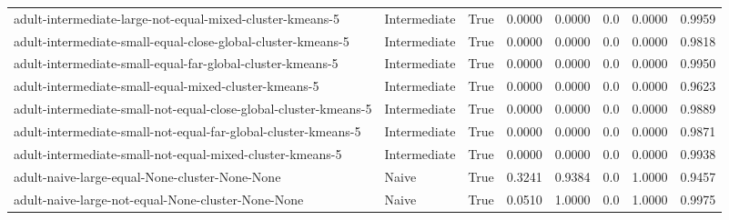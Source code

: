 \begin{tabular}{lllrrrrr}
                              adult-intermediate-large-not-equal-mixed-cluster-kmeans-5 & Intermediate &        True &                0.0000 &                0.0000 &                           0.0 &                        0.0000 &                        0.9959 \\
                           adult-intermediate-small-equal-close-global-cluster-kmeans-5 & Intermediate &        True &                0.0000 &                0.0000 &                           0.0 &                        0.0000 &                        0.9818 \\
                             adult-intermediate-small-equal-far-global-cluster-kmeans-5 & Intermediate &        True &                0.0000 &                0.0000 &                           0.0 &                        0.0000 &                        0.9950 \\
                                  adult-intermediate-small-equal-mixed-cluster-kmeans-5 & Intermediate &        True &                0.0000 &                0.0000 &                           0.0 &                        0.0000 &                        0.9623 \\
                       adult-intermediate-small-not-equal-close-global-cluster-kmeans-5 & Intermediate &        True &                0.0000 &                0.0000 &                           0.0 &                        0.0000 &                        0.9889 \\
                         adult-intermediate-small-not-equal-far-global-cluster-kmeans-5 & Intermediate &        True &                0.0000 &                0.0000 &                           0.0 &                        0.0000 &                        0.9871 \\
                              adult-intermediate-small-not-equal-mixed-cluster-kmeans-5 & Intermediate &        True &                0.0000 &                0.0000 &                           0.0 &                        0.0000 &                        0.9938 \\
                                         adult-naive-large-equal-None-cluster-None-None &        Naive &        True &                0.3241 &                0.9384 &                           0.0 &                        1.0000 &                        0.9457 \\
                                     adult-naive-large-not-equal-None-cluster-None-None &        Naive &        True &                0.0510 &                1.0000 &                           0.0 &                        1.0000 &                        0.9975 \\

\end{tabular}
